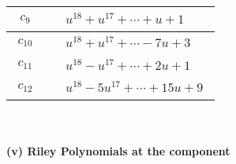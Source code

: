 \documentclass[1p]{elsarticle_modified}
\theoremstyle{definition}
\begin{document}
\begin{tabular}{m{50pt}|m{274pt}}
\hline $$\begin{aligned}c_{9}\end{aligned}$$&$\begin{aligned}
&u^{18}+u^{17}+\cdots+u+1
\end{aligned}$\\
\hline $$\begin{aligned}c_{10}\end{aligned}$$&$\begin{aligned}
&u^{18}+u^{17}+\cdots-7 u+3
\end{aligned}$\\
\hline $$\begin{aligned}c_{11}\end{aligned}$$&$\begin{aligned}
&u^{18}- u^{17}+\cdots+2 u+1
\end{aligned}$\\
\hline $$\begin{aligned}c_{12}\end{aligned}$$&$\begin{aligned}
&u^{18}-5 u^{17}+\cdots+15 u+9
\end{aligned}$\\
\hline
\end{tabular}\\~\\
\newpage\renewcommand{\arraystretch}{1}
\flushleft \textbf{(v) Riley Polynomials at the component}\newline \\
\end{document}
